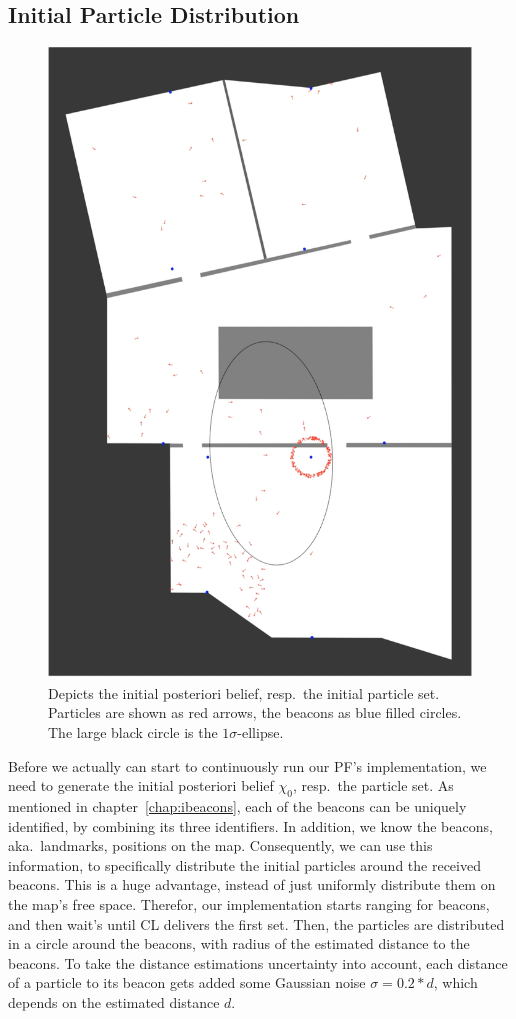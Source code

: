 \subsection{Initial Particle Distribution}\label{sec:algo_initial}

\begin{figure}
\includegraphics[height=0.7\textwidth]{figures/algo_particle_generation}
\caption{Depicts the initial posteriori belief, resp.\ the initial particle set. Particles are shown as red arrows, the beacons as blue filled circles. The large black circle is the $1\sigma$-ellipse.}
\label{fig:pf_initialDist}
\end{figure}

Before we actually can start to continuously run our \acs{PF}'s implementation, we need to generate the initial posteriori belief $\chi_0$, resp.\ the particle set. As mentioned in chapter~\ref{chap:ibeacons}, each of the beacons can be uniquely identified, by combining its three identifiers. In addition, we know the beacons, aka.\ landmarks, positions on the map. Consequently, we can use this information, to specifically distribute the initial particles around the received beacons. This is a huge advantage, instead of just uniformly distribute them on the map's free space. Therefor, our implementation starts ranging for beacons, and then wait's until \ac{CL} delivers the first set. Then, the particles are distributed in a circle around the beacons, with radius of the estimated distance to the beacons. To take the distance estimations uncertainty into account, each distance of a particle to its beacon gets added some Gaussian noise $\sigma = 0.2 * d$, which depends on the estimated distance $d$. 

